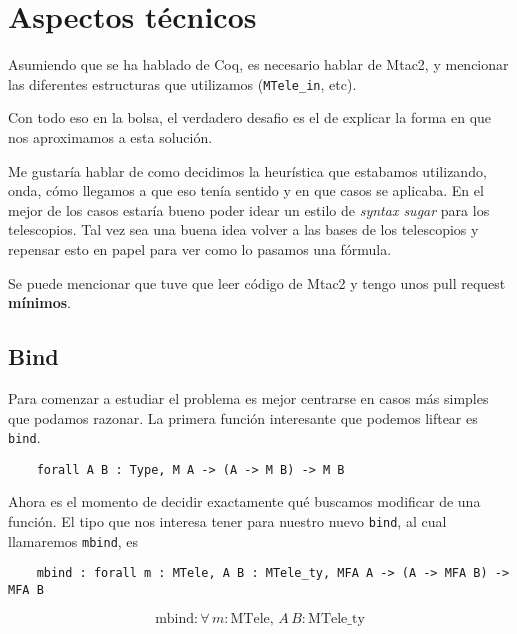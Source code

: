 \section{Aspectos técnicos}

Asumiendo que se ha hablado de Coq, es necesario hablar de Mtac2, y mencionar
las diferentes estructuras que utilizamos (\texttt{MTele_in}, etc).

Con todo eso en la bolsa, el verdadero desafio es el de explicar la forma en que
nos aproximamos a esta solución.


Me gustaría hablar de como decidimos la heurística que estabamos utilizando,
onda, cómo llegamos a que eso tenía sentido y en que casos se aplicaba.
En el mejor de los casos estaría bueno poder idear un estilo de \textit{syntax
  sugar} para los telescopios.
Tal vez sea una buena idea volver a las bases de los telescopios y repensar esto
en papel para ver como lo pasamos una fórmula.

Se puede mencionar que tuve que leer código de Mtac2 y tengo unos pull request
\textbf{mínimos}.

\subsection{Bind}


Para comenzar a estudiar el problema es mejor centrarse en casos más simples que
podamos razonar. La primera función interesante que podemos liftear es
\texttt{bind}.
\begin{center}
  \begin{verbatim}
    forall A B : Type, M A -> (A -> M B) -> M B
  \end{verbatim}
\end{center}
Ahora es el momento de decidir exactamente qué buscamos modificar de una
función. El tipo que nos interesa tener para nuestro nuevo
\texttt{bind}, al cual llamaremos \texttt{mbind}, es
\begin{center}
  \begin{verbatim}
    mbind : forall m : MTele, A B : MTele_ty, MFA A -> (A -> MFA B) -> MFA B
  \end{verbatim}
\end{center}
$$\text{mbind} : \forall \, m : \text{MTele} , \, A\, B : \text{MTele\_ty}
$$